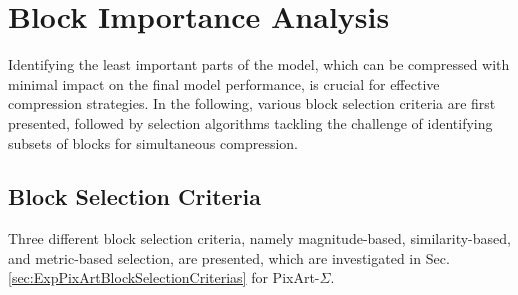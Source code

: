 %


\section{Block Importance Analysis}
\label{sec:MethodsBlockImportanceAnalysis}
Identifying the least important parts of the model, which can be compressed with minimal impact on the final model performance, is crucial for effective compression strategies. In the following, various block selection criteria are first presented, followed by selection algorithms tackling the challenge of identifying subsets of blocks for simultaneous compression.
\label{sec:BlockImportanceAnalyses}
\subsection{Block Selection Criteria}
Three different block selection criteria, namely magnitude-based, similarity-based, and metric-based selection, are presented, which are investigated in Sec. \ref{sec:ExpPixArtBlockSelectionCriterias} for PixArt-$\Sigma$.

